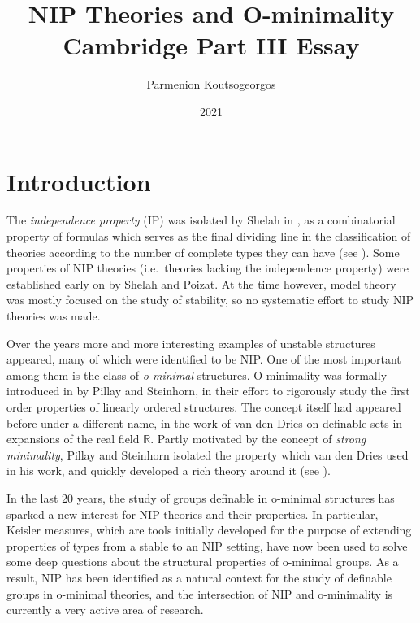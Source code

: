 \documentclass[a4paper]{report}
\newcommand{\ind}{\hspace{15pt}}
\newcommand{\R}{\mathbb{R}}
\theoremstyle{definition}
\theoremstyle{remstyle}
\newcommand{\uchapter}[1]{%
	\chapter*{#1}%
	\markboth{#1}{}%
	\addcontentsline{toc}{chapter}{#1}%
}
\begin{document}
\title{NIP Theories and O-minimality \\ \vspace{+8pt} \large Cambridge Part III Essay}
\author{Parmenion Koutsogeorgos}
\date{2021}

\maketitle

\vspace{+16pt}

\tableofcontents

\newpage


\uchapter{Introduction}

\ind The \emph{independence property} (IP) was isolated by Shelah in \cite{nip og}, as a combinatorial property of formulas which serves as the final dividing line in the classification of theories according to the number of complete types they can have (see \cite{stability function, six classes}). Some properties of NIP theories (i.e.\ theories lacking the independence property) were established early on by Shelah and Poizat. At the time however, model theory was mostly focused on the study of stability, so no systematic effort to study NIP theories was made.

\ind Over the years more and more interesting examples of unstable structures appeared, many of which were identified to be NIP. One of the most important among them is the class of \emph{o-minimal} structures. O-minimality was formally introduced in \cite{defI} by Pillay and Steinhorn, in their effort to rigorously study the first order properties of linearly ordered structures. The concept itself had appeared before under a different name, in the work of van den Dries on definable sets in expansions of the real field $\R$. Partly motivated by the concept of \emph{strong minimality}, Pillay and Steinhorn isolated the property which van den Dries used in his work, and quickly developed a rich theory around it (see \cite{defI,defII,discrete,defIII}).

\ind In the last 20 years, the study of groups definable in o-minimal structures has sparked a new interest for NIP theories and their properties. In particular, Keisler measures, which are tools initially developed for the purpose of extending properties of types from a stable to an NIP setting, have now been used to solve some deep questions about the structural properties of o-minimal groups. As a result, NIP has been identified as a natural context for the study of definable groups in o-minimal theories, and the intersection of NIP and o-minimality is currently a very active area of research.
\end{document}
